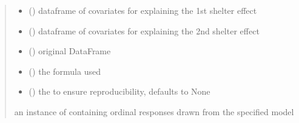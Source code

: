 \documentclass[letterpaper,10pt,english]{sphinxmanual}
\begin{document}
\begin{fulllineitems}
\begin{quote}
\begin{description}
\begin{itemize}
\item {} 
\sphinxAtStartPar
{} () \textendash{} dataframe of covariates for explaining the 1st shelter effect

\item {} 
\sphinxAtStartPar
{} () \textendash{} dataframe of covariates for explaining the 2nd shelter effect

\item {} 
\sphinxAtStartPar
{} () \textendash{} original DataFrame

\item {} 
\sphinxAtStartPar
{} () \textendash{} the formula used

\item {} 
\sphinxAtStartPar
{} (\sphinxstyleliteralemphasis{\sphinxupquote{, }}) \textendash{} the  to ensure reproducibility, defaults to None

\end{itemize}

\sphinxAtStartPar
an instance of  containing ordinal responses drawn from the specified model

\end{description}\end{quote}

\end{fulllineitems}

\end{document}
